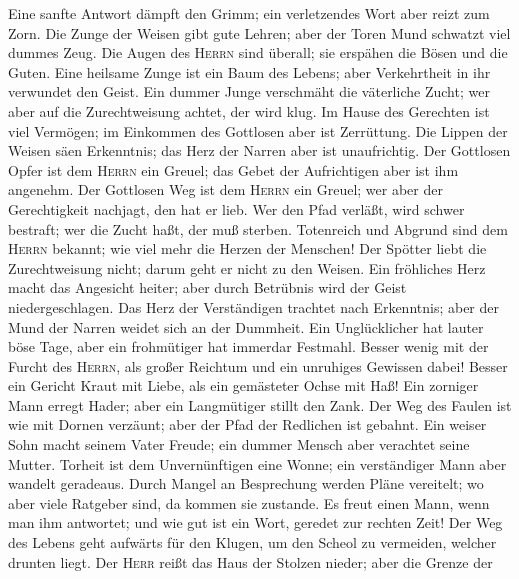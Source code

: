  Eine sanfte Antwort dämpft den Grimm; ein verletzendes
Wort aber reizt zum Zorn.  Die Zunge der Weisen gibt gute
Lehren; aber der Toren Mund schwatzt viel dummes Zeug. 
Die Augen des \textsc{Herrn} sind überall; sie erspähen die Bösen und
die Guten.  Eine heilsame Zunge ist ein Baum des Lebens;
aber Verkehrtheit in ihr verwundet den Geist.  Ein dummer
Junge verschmäht die väterliche Zucht; wer aber auf die Zurechtweisung
achtet, der wird klug.  Im Hause des Gerechten ist viel
Vermögen; im Einkommen des Gottlosen aber ist Zerrüttung. 
Die Lippen der Weisen säen Erkenntnis; das Herz der Narren aber ist
unaufrichtig.  Der Gottlosen Opfer ist dem \textsc{Herrn}
ein Greuel; das Gebet der Aufrichtigen aber ist ihm angenehm.
 Der Gottlosen Weg ist dem \textsc{Herrn} ein Greuel; wer
aber der Gerechtigkeit nachjagt, den hat er lieb.  Wer
den Pfad verläßt, wird schwer bestraft; wer die Zucht haßt, der muß
sterben.  Totenreich und Abgrund sind dem \textsc{Herrn}
bekannt; wie viel mehr die Herzen der Menschen!  Der
Spötter liebt die Zurechtweisung nicht; darum geht er nicht zu den
Weisen.  Ein fröhliches Herz macht das Angesicht heiter;
aber durch Betrübnis wird der Geist niedergeschlagen. 
Das Herz der Verständigen trachtet nach Erkenntnis; aber der Mund der
Narren weidet sich an der Dummheit.  Ein Unglücklicher
hat lauter böse Tage, aber ein frohmütiger hat immerdar Festmahl.
 Besser wenig mit der Furcht des \textsc{Herrn}, als
großer Reichtum und ein unruhiges Gewissen dabei!  Besser
ein Gericht Kraut mit Liebe, als ein gemästeter Ochse mit Haß!
 Ein zorniger Mann erregt Hader; aber ein Langmütiger
stillt den Zank.  Der Weg des Faulen ist wie mit Dornen
verzäunt; aber der Pfad der Redlichen ist gebahnt.  Ein
weiser Sohn macht seinem Vater Freude; ein dummer Mensch aber verachtet
seine Mutter.  Torheit ist dem Unvernünftigen eine Wonne;
ein verständiger Mann aber wandelt geradeaus.  Durch
Mangel an Besprechung werden Pläne vereitelt; wo aber viele Ratgeber
sind, da kommen sie zustande.  Es freut einen Mann, wenn
man ihm antwortet; und wie gut ist ein Wort, geredet zur rechten Zeit!
 Der Weg des Lebens geht aufwärts für den Klugen, um den
Scheol zu vermeiden, welcher drunten liegt.  Der
\textsc{Herr} reißt das Haus der Stolzen nieder; aber die Grenze der
